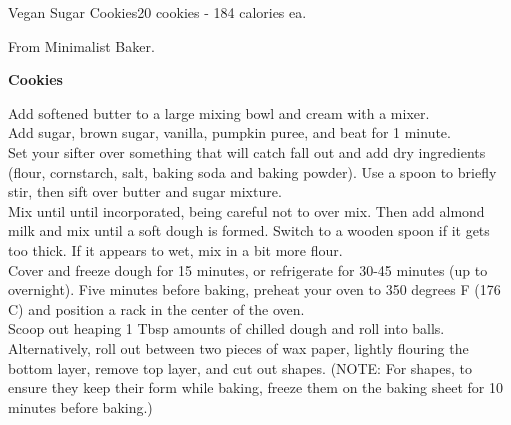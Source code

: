 \begin{recipe}{Vegan Sugar Cookies}{20 cookies - 184 calories ea.}{}

\freeform From Minimalist Baker.


\textbf{Cookies}

Add softened butter to a large mixing bowl and cream with a mixer.\\

Add sugar, brown sugar, vanilla, pumpkin puree, and beat for 1 minute.\\

Set your sifter over something that will catch fall out and add dry ingredients (flour, cornstarch, salt, baking soda and baking powder). Use a spoon to briefly stir, then sift over butter and sugar mixture.\\

Mix until until incorporated, being careful not to over mix. Then add almond milk and mix until a soft dough is formed. Switch to a wooden spoon if it gets too thick. If it appears to wet, mix in a bit more flour.\\

Cover and freeze dough for 15 minutes, or refrigerate for 30-45 minutes (up to overnight).
Five minutes before baking, preheat your oven to 350 degrees F (176 C) and position a rack in the center of the oven.\\

Scoop out heaping 1 Tbsp amounts of chilled dough and roll into balls. Alternatively, roll out between two pieces of wax paper, lightly flouring the bottom layer, remove top layer, and cut out shapes. (NOTE: For shapes, to ensure they keep their form while baking, freeze them on the baking sheet for 10 minutes before baking.)\\\newpage


\end{recipe}
